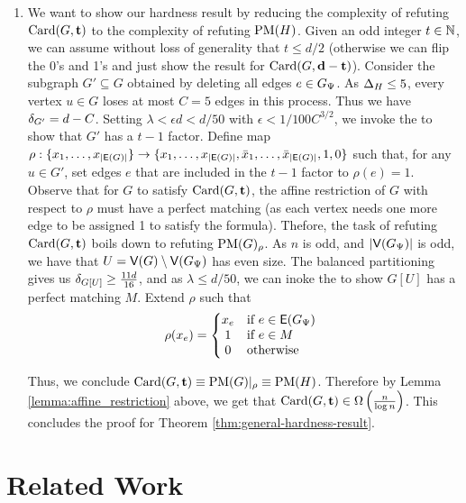\documentclass[11pt]{article}
\begin{document}
\begin{enumerate}
\item{
     We want to show our hardness result by reducing the complexity of refuting $\text{Card}(G, \mathbf{t})$ to the complexity of refuting $\text{PM}(H)$.
Given an odd integer $t \in \mathbb{N}$, we can assume without loss of generality that $t \le d/2$ (otherwise we can flip the 0's and 1's and just show the result for $\text{Card}(G, \mathbf{d-t})$).  
  Consider the subgraph $G' \subseteq G$ obtained by deleting all edges $e \in G_{\Psi}$. As $\Delta_{H} \leq 5$, every vertex $u \in G$ loses at most $C=5$ edges in this process.
  Thus we have $\delta_{G'} = d - C$. Setting $\lambda < \epsilon d < d/50$ with $\epsilon < 1/100C^{3/2}$, we invoke the  to show that $G'$ has a $t-1$ factor.
  Define map $\rho: \{x_1, \dots, x_{|\mathsf{E}(G)|}\} \rightarrow \{x_1, \dots, x_{|\mathsf{E}(G)|}, \bar{x}_1, \dots, \bar{x}_{|\mathsf{E}(G)|}, 1, 0 \}$ such that, for any $u \in G'$, set edges $e$ that are included in the $t-1$ factor to $\rho(e) = 1$.
  Observe that for $G$ to satisfy $\text{Card}(G, \mathbf{t})$, the affine restriction of $G$ with respect to $\rho$ must have a perfect matching (as each vertex needs one more edge to be assigned 1 to satisfy the formula).
Thefore, the task of refuting $\text{Card}(G, \mathbf{t})$ boils down to refuting $\text{PM}(G)_{\rho}$. As $n$ is odd, and $|\mathsf{V}(G_{\Psi})|$ is odd, we have that $U = \mathsf{V}(G) \setminus \mathsf{V}(G_{\Psi})$ has even size.
    The balanced partitioning gives us $\delta_{G[U]} \geq \frac{11d}{16}$, and as $\lambda \leq d/50$, we can inoke the  to show $G[U]$ has a perfect matching $M$.
Extend $\rho$ such that
\[
\rho(x_e) =
\left\{
\begin{array}{@{}cl}
x_e & \text{if } e \in \Edges{G_{\EmbeddingFunc}} \\
1 & \text{if } e \in M \\
0 & \text{otherwise}
\end{array}
\right.
\]

Thus, we conclude $\text{Card}(G, \mathbf{t}) \equiv \text{PM}(G)|_\rho \equiv \text{PM}(H)$. Therefore by Lemma \ref{lemma:affine_restriction} above, we get that $\text{Card}(G, \mathbf{t}) \in \Omega\left(\frac{n}{\log n}\right)$. This concludes the proof for Theorem \ref{thm:general-hardness-result}.
}


  \end{enumerate}





\section{Related Work}
\label{sec:related-work}

\newpage


\clearpage
\appendix
\end{document}
